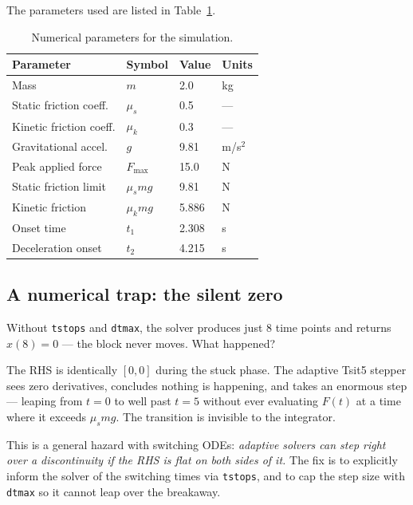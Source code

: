 \documentclass[11pt, a4paper]{article}
\begin{document}
\noindent
The parameters used are listed in Table~\ref{tab:params}.

\begin{table}[H]
\centering
\caption{Numerical parameters for the simulation.}
\label{tab:params}
\begin{tabular}{@{}llll@{}}
\toprule
\textbf{Parameter} & \textbf{Symbol} & \textbf{Value} & \textbf{Units} \\
\midrule
Mass                    & $m$        & 2.0   & kg \\
Static friction coeff.  & $\mu_s$    & 0.5   & --- \\
Kinetic friction coeff. & $\mu_k$    & 0.3   & --- \\
Gravitational accel.    & $g$        & 9.81  & m/s$^2$ \\
Peak applied force      & $F_{\max}$ & 15.0  & N \\
\midrule
Static friction limit   & $\mu_s mg$ & 9.81  & N \\
Kinetic friction        & $\mu_k mg$ & 5.886 & N \\
Onset time              & $t_1$      & 2.308 & s \\
Deceleration onset      & $t_2$      & 4.215 & s \\
\bottomrule
\end{tabular}
\end{table}

\subsection{A numerical trap: the silent zero}

Without \texttt{tstops} and \texttt{dtmax}, the solver produces just 8 time
points and returns $x(8) = 0$ --- the block never moves.  What happened?

The RHS is identically $[0, 0]$ during the stuck phase.  The adaptive
Tsit5 stepper sees zero derivatives, concludes nothing is happening,
and takes an enormous step --- leaping from $t = 0$ to well past
$t = 5$ without ever evaluating $F(t)$ at a time where it exceeds
$\mu_s mg$.  The transition is invisible to the integrator.

This is a general hazard with switching ODEs: \emph{adaptive solvers can
step right over a discontinuity if the RHS is flat on both sides of it.}
The fix is to explicitly inform the solver of the switching times via
\texttt{tstops}, and to cap the step size with \texttt{dtmax} so it
cannot leap over the breakaway.
\end{document}
